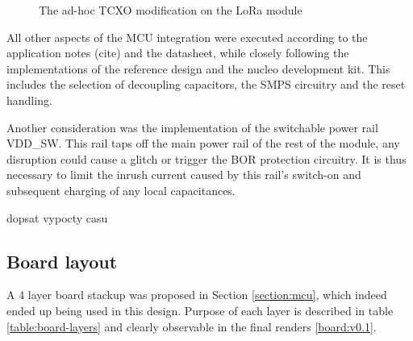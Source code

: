 \begin{figure}
    \centering
     \hfil
    \caption{\label{fig:tcxo-bodge}The ad-hoc TCXO modification on the LoRa module}
\end{figure}

All other aspects of the MCU integration were executed according to the application notes (cite) and the datasheet, while closely following the implementations of the reference design and the nucleo development kit. This includes the selection of decoupling capacitors, the SMPS circuitry and the reset handling.

Another consideration was the implementation of the switchable power rail VDD\_SW. This rail taps off the main power rail of the rest of the module, any disruption could cause a glitch or trigger the BOR protection circuitry. It is thus necessary to limit the inrush current caused by this rail's switch-on and subsequent charging of any local capacitances.

dopsat vypocty casu

\subsection{Board layout}
A 4 layer board stackup was proposed in Section \ref{section:mcu}, which indeed ended up being used in this design. Purpose of each layer is described in table \ref{table:board-layers} and clearly observable in the final renders \ref{board:v0.1}.

